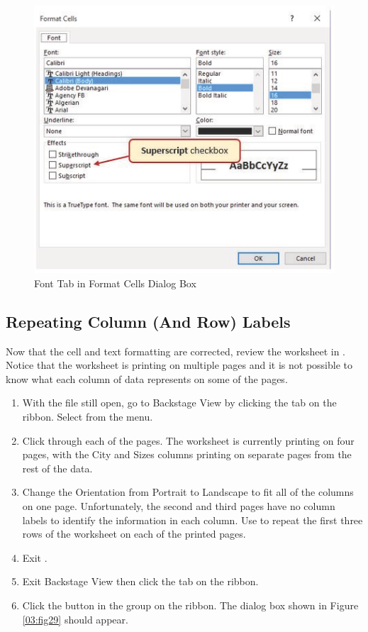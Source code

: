 \begin{figure}[H]
	\centering
	\includegraphics[width=\maxwidth{.95\linewidth}]{gfx/ch03_fig28}
	\caption{Font Tab in Format Cells Dialog Box}
	\label{03:fig28}
\end{figure}

\subsection{Repeating Column (And Row) Labels}

Now that the cell and text formatting are corrected, review the worksheet in . Notice that the worksheet is printing on multiple pages and it is not possible to know what each column of data represents on some of the pages.

\begin{enumerate}
	\item With the  file still open, go to Backstage View by clicking the  tab on the ribbon. Select  from the menu.
	\item Click through each of the pages. The worksheet is currently printing on four pages, with the City and Sizes columns printing on separate pages from the rest of the data.
	\item Change the Orientation from Portrait to Landscape to fit all of the columns on one page. Unfortunately, the second and third pages have no column labels to identify the information in each column. Use  to repeat the first three rows of the worksheet on each of the printed pages. 
	\item Exit .
	\item Exit Backstage View then click the  tab on the ribbon.
	\item Click the  button in the  group on the ribbon. The dialog box shown in Figure \ref{03:fig29} should appear.
\end{enumerate}

